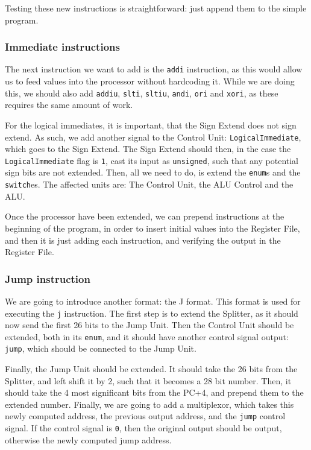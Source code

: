 Testing these new instructions is straightforward: just append them to the
simple program.

\subsubsection*{Immediate instructions}
The next instruction we want to add is the \texttt{addi} instruction, as this
would allow us to feed values into the processor without hardcoding it. While
we are doing this, we should also add \texttt{addiu}, \texttt{slti},
\texttt{sltiu}, \texttt{andi}, \texttt{ori} and \texttt{xori}, as these
requires the same amount of work.

For the logical immediates, it is important, that the Sign Extend does not
sign extend. As such, we add another signal to the Control Unit:
\texttt{LogicalImmediate}, which goes to the Sign Extend. The Sign Extend
should then, in the case the \texttt{LogicalImmediate} flag is \texttt{1}, cast
its input as \texttt{unsigned}, such that any potential sign bits are not
extended. Then, all we need to do, is extend the \texttt{enum}s and the
\texttt{switch}es. The affected units are: The Control Unit, the ALU Control
and the ALU.

Once the processor have been extended, we can prepend instructions at the
beginning of the program, in order to insert initial values into the Register
File, and then it is just adding each instruction, and verifying the output in
the Register File.

\subsubsection*{Jump instruction}
We are going to introduce another format: the J format. This format is used for
executing the \texttt{j} instruction. The first step is to extend the Splitter,
as it should now send the first 26 bits to the Jump Unit. Then the Control Unit
should be extended, both in its \texttt{enum}, and it should have another
control signal output: \texttt{jump}, which should be connected to the Jump
Unit.

Finally, the Jump Unit should be extended. It should take the 26 bits from the
Splitter, and left shift it by 2, such that it becomes a 28 bit number. Then,
it should take the 4 most significant bits from the PC+4, and prepend them to
the extended number.  Finally, we are going to add a multiplexor, which takes
this newly computed address, the previous output address, and the \texttt{jump}
control signal. If the control signal is \texttt{0}, then the original output
should be output, otherwise the newly computed jump address.

